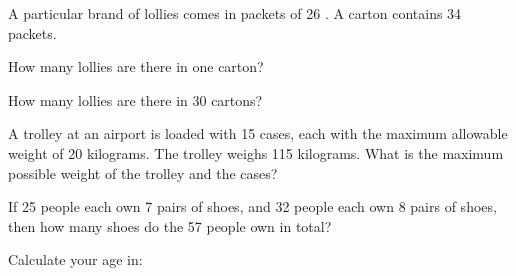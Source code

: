 \begin{exercises}
\begin{questions}
\begin{parts}
\end{parts}
        \Question[] A particular brand of lollies comes in packets of 26 . A carton contains 34 packets.
        \begin{parts} 
            \Part[1] How many lollies are there in one carton?
            \begin{solutionordottedlines}[1in]
            \end{solutionordottedlines}
            \Part[1] How many lollies are there in 30 cartons?
            \begin{solutionordottedlines}[1in]
            \end{solutionordottedlines}
        \end{parts}
        \Question[2] A trolley at an airport is loaded with 15 cases, each with the maximum allowable weight of 20 kilograms. The trolley weighs 115 kilograms. What is the maximum possible weight of the trolley and the cases?
            \begin{solutionordottedlines}[1in]
            \end{solutionordottedlines}
        \Question[2] If 25 people each own 7 pairs of shoes, and 32 people each own 8 pairs of shoes, then how many shoes do the 57 people own in total?
            \begin{solutionordottedlines}[1in]
            \end{solutionordottedlines}
        \Question[5] Calculate your age in:
\end{questions}
\end{exercises}
